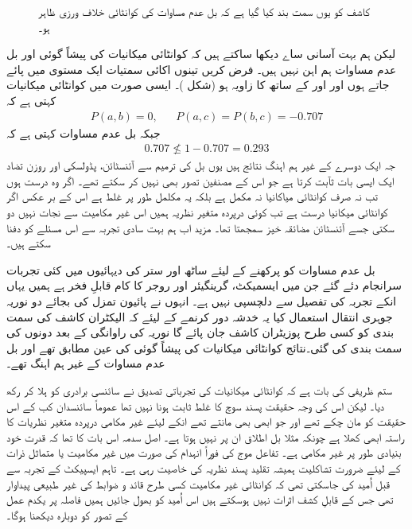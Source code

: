 \begin{figure}
\centering
{}
\caption{کاشف کو یوں سمت بند کیا گیا ہے کہ بل عدم مساوات کی کوانٹائی   خلاف ورزی   ظاہر ہو۔}
\label{شکل_بکھراو_بل_عدم_مساوات}
\end{figure}

لیکن ہم بہت آسانی ساے دیکھا ساکتے ہیں کہ کوانٹائی میکانیات کی پیشاً گوئی  اور بل عدم مساوات ہم اہن نہیں ہیں۔ فرض کریں تینوں اکائی سمتیات ایک مستوی میں پائے جاتے ہوں اور  اور  کے ساتھ  کا زاویہ  ہو (شکل )۔ ایسی صورت میں کوانٹائی میکانیات کہتی ہے کہ 
\begin{align*}
	P(a, b) = 0, && P(a, c) = P(b, c) = -\num{0.707}
\end{align*}
جبکہ بل عدم مساوات کہتی ہے کہ
\begin{align*}
	\num{0.707}\nleq1-\num{0.707} = \num{0.293}
\end{align*}
جہ ایک دوسرے کے غیر ہم اہنگ نتائج ہیں یوں بل کی ترمیم سے آئنسٹائن، پڈولسکی اور روزن تضاد ایک ایسی بات ثآبت کرتا ہے جو اس کے مصنفین تصور بھی نہیں کر سکتے تھے۔ اگر وہ درست ہوں تب نہ صرف کوانٹائی میاکانیا نہ مکمل ہے بلکہ یہ مکلمل طور پر غلط ہے اس کے بر عکس اگر کوانٹائی میکانیا درست ہے تب کوئی درپردہ متغیر نظریہ ہمیں اس غیر مکامیت سے نجات نہیں دو سکتی جسے آئنسٹائن مضائقہ خیز سمجھتا تھا۔	 مزید اب ہم بہت سادی تجربہ سے اس مسئلے کو دفنا سکتے ہیں۔

بل عدم مساوات کو پرکھنے کے لیئے ساٹھ اور ستر کی دیہائیوں میں کئی تجربات سرانجام دئے گئے جن میں ایسمیکٹ، گرینگیئر اور روجر کا کام قابلِ فخر ہے ہمیں یہاں انکے تجربہ کی تفصیل سے دلچسپی نہیں ہے۔ انہوں نے پائیون تمزل کی بجائے دو نوریہ جوہری انتقال استعمال کیا یہ خدشہ دور کرنمے کے لیئے کہ الیکٹران کاشف کی سمت بندی کو کسی طرح پوزیٹران کاشف جان پائے گا  نوریہ کی راوانگی کے بعد دونوں کی سمت بندی کی گئی۔نتائج کوانٹائی میکانیات کی پیشاً گوئی کی عین مطابق تھے اور بل عدم مساوات کے غیر ہم اہنگ تھے۔

ستم ظریفی کی بات ہے کہ کوانٹائی میکانیات کی تجرباتی تصدیق نے سائنسی برادری کو ہلا کر رکھ دیا۔ لیکن اس کی وجہ حقیقت پسند سوچ کا غلط ثابت ہونا نہیں تھا عموماً سائنسدان کب کے اس حقیقت کو مان چکے تھے اور جو ابھی بھی مانتے تھے انکے لیئے غیر مکامی درپردہ متغیر نظریات کا راستہ ابھی کھلا ہے چونکہ مثلا بل اطلاق ان پر نہیں ہوتا ہے۔ اصل سدمہ اس بات کا تھا کہ قدرت خود بنیادی طور پر غیر مکامی ہے۔ تفاعل موج کی فوراً انہدام کی صورت میں غیر مکامیت یا متماثل ذرات کے لیئے ضرورت تشاکلیت ہمیشہ تقلید پسند نظریہ کی خاصیت رہی ہے۔ تاہم ایسپیکٹ کے تجربہ سے قبل اُمید کی جاسکتی تھی کہ کوانٹائی غیر مکامیت کسی طرح قائد و ضوابط کی غیر طبیعی پیداوار تھی جس کے قابلِ کشف اثرات نہیں ہوسکتے ہیں اس اُمید کو بھول جائیں ہمیں فاصلہ پر یکدم عمل کے تصور کو دوبارہ دیکھنا ہوگا۔

